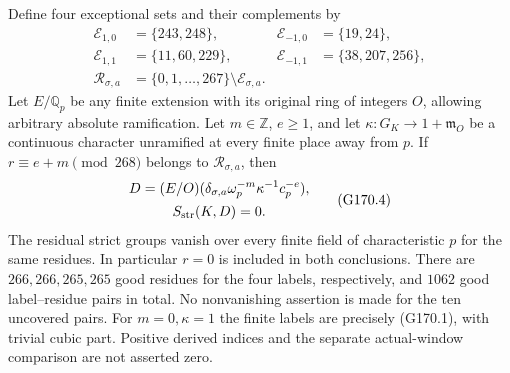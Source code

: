\begin{theorem}
\label{AC-G170}
Define four exceptional sets and their complements by
\[
 \begin{aligned}
 \mathcal E_{1,0}&=\{243,248\},&
 \mathcal E_{-1,0}&=\{19,24\},\\
 \mathcal E_{1,1}&=\{11,60,229\},&
 \mathcal E_{-1,1}&=\{38,207,256\},\\
 \mathcal R_{\sigma,a}&=\{0,1,\ldots,267\}\setminus\mathcal E_{\sigma,a}.
 \end{aligned}
 \tag{G170.3}
\]
Let $E/\mathbb Q_p$ be any finite extension with its original
ring of integers $O$, allowing arbitrary absolute ramification.
Let $m\in\mathbb Z$, $e\geq1$, and let
$\kappa:G_K\to1+\mathfrak m_O$ be a continuous character
unramified at every finite place away from $p$.
If $r\equiv e+m\pmod{268}$ belongs to $\mathcal R_{\sigma,a}$, then
\[
 \begin{gathered}
 D=(E/O)(\delta_{\sigma,a}\omega_p^{-m}\kappa^{-1}c_p^{-e}),\\
                            S_{\rm str}(K,D)=0.
 \end{gathered}
 \tag{G170.4}
\]
The residual strict groups vanish over every finite field of
characteristic $p$ for the same residues.
In particular $r=0$ is included in both conclusions.
There are $266,266,265,265$ good residues for the four labels,
respectively, and $1062$ good label--residue pairs in total.
No nonvanishing assertion is made for the ten uncovered pairs.
For $m=0,\kappa=1$ the finite labels are precisely (G170.1),
with trivial cubic part.  Positive derived indices and the
separate actual-window comparison are not asserted zero.
\end{theorem}

